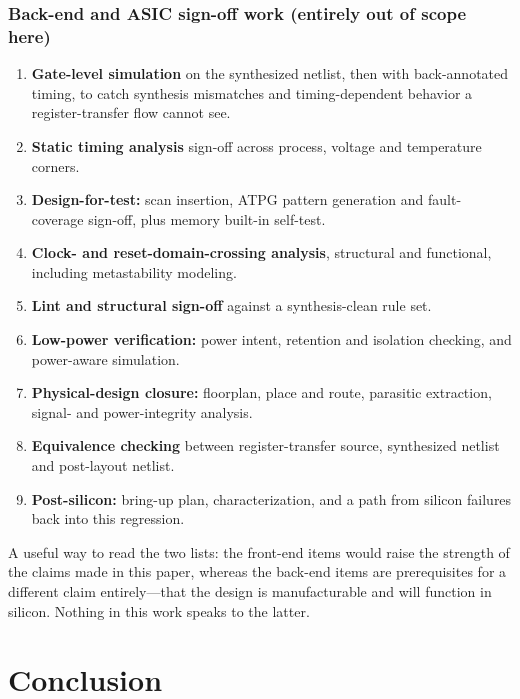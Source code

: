 \documentclass[conference]{IEEEtran}
\begin{document}
\subsubsection{Back-end and ASIC sign-off work (entirely out of scope here)}
\begin{enumerate}
\item \textbf{Gate-level simulation} on the synthesized netlist, then
with back-annotated timing, to catch synthesis mismatches and
timing-dependent behavior a register-transfer flow cannot see.
\item \textbf{Static timing analysis} sign-off across process, voltage
and temperature corners.
\item \textbf{Design-for-test:} scan insertion, ATPG pattern generation
and fault-coverage sign-off, plus memory built-in self-test.
\item \textbf{Clock- and reset-domain-crossing analysis}, structural and
functional, including metastability modeling.
\item \textbf{Lint and structural sign-off} against a synthesis-clean
rule set.
\item \textbf{Low-power verification:} power intent, retention and
isolation checking, and power-aware simulation.
\item \textbf{Physical-design closure:} floorplan, place and route,
parasitic extraction, signal- and power-integrity analysis.
\item \textbf{Equivalence checking} between register-transfer source,
synthesized netlist and post-layout netlist.
\item \textbf{Post-silicon:} bring-up plan, characterization, and a
path from silicon failures back into this regression.
\end{enumerate}

A useful way to read the two lists: the front-end items would raise the
strength of the claims made in this paper, whereas the back-end items are
prerequisites for a different claim entirely---that the design is
manufacturable and will function in silicon. Nothing in this work speaks
to the latter.

\section{Conclusion}
\label{sec:conclusion}
\end{document}
